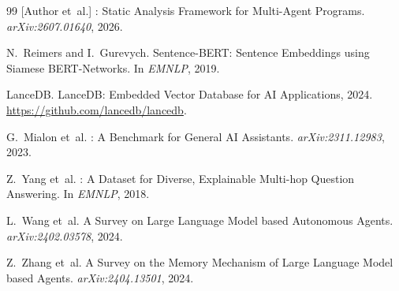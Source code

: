 \documentclass[11pt]{article}
\begin{document}
\begin{thebibliography}{99}
[Author et~al.]
: Static Analysis Framework for Multi-Agent Programs.
\newblock \emph{arXiv:2607.01640}, 2026.

N.~Reimers and I.~Gurevych.
\newblock Sentence-{BERT}: Sentence Embeddings using Siamese
  {BERT}-Networks.
\newblock In \emph{EMNLP}, 2019.

LanceDB.
\newblock LanceDB: Embedded Vector Database for AI Applications, 2024.
\newblock \url{https://github.com/lancedb/lancedb}.

G.~Mialon et~al.
: A Benchmark for General AI Assistants.
\newblock \emph{arXiv:2311.12983}, 2023.

Z.~Yang et~al.
: A Dataset for Diverse, Explainable Multi-hop Question
  Answering.
\newblock In \emph{EMNLP}, 2018.

L.~Wang et~al.
\newblock A Survey on Large Language Model based Autonomous Agents.
\newblock \emph{arXiv:2402.03578}, 2024.

Z.~Zhang et~al.
\newblock A Survey on the Memory Mechanism of Large Language Model based Agents.
\newblock \emph{arXiv:2404.13501}, 2024.

\end{thebibliography}
\end{document}
